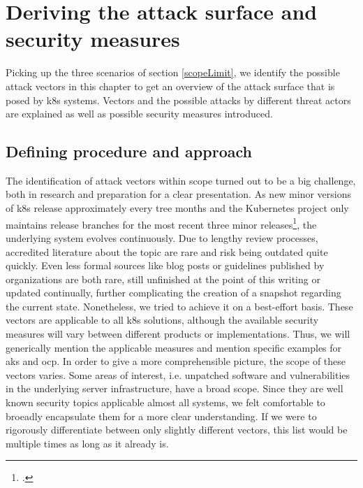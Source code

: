 
\chapter{Deriving the attack surface and security measures}

Picking up the three scenarios of section \ref{scopeLimit}, we identify the possible attack vectors in this chapter to get an overview of the attack surface that is posed by \gls{k8s} systems. Vectors and the possible attacks by different threat actors are explained as well as possible security measures introduced.

\section{Defining procedure and approach}

The identification of attack vectors within scope turned out to be a big challenge, both in research and preparation for a clear presentation. 
As new minor versions of \gls{k8s} release approximately every tree months and the Kubernetes project only maintains release branches for the most recent three minor releases\footcite{k8sSupport}, the underlying system evolves continuously. Due to lengthy review processes, accredited literature about the topic are rare and risk being outdated quite quickly. Even less formal sources like blog posts or guidelines published by organizations are both rare, still unfinished at the point of this writing or updated continually, further complicating the creation of a snapshot regarding the current state. Nonetheless, we tried to achieve it on a best-effort basis.
These vectors are applicable to all \gls{k8s} solutions, although the available security measures will vary between different products or implementations. Thus, we will generically mention the applicable measures and mention specific examples for \gls{aks} and \gls{ocp}.
In order to give a more comprehensible picture, the scope of these vectors varies. Some areas of interest, i.e. unpatched software and vulnerabilities in the underlying server  infrastructure, have a broad scope. Since they are well known security topics applicable almost all systems, we felt comfortable to broeadly encapsulate them for a more clear understanding. If we were to rigorously differentiate between only slightly different vectors, this list would be multiple times as long as it already is.

